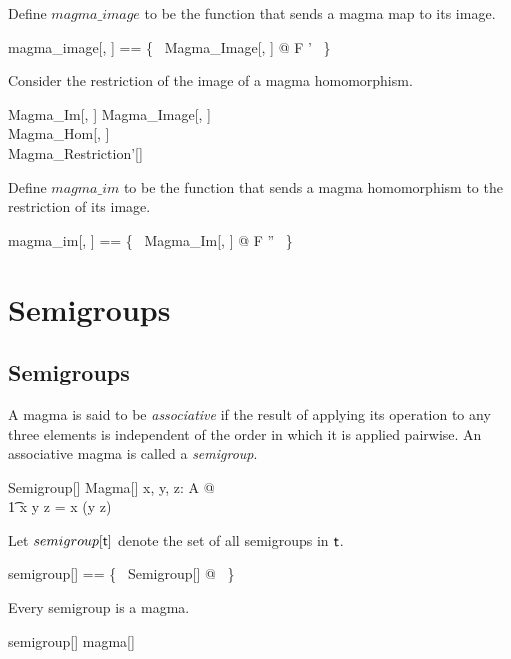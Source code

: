 \documentclass{amsart}
\begin{document}
Define $magma\_image$ to be the function that sends a magma map to its image.

\begin{zed}
	magma\_image[\genT, \genU] == \{~ Magma\_Image[\genT, \genU] @ F \mapsto \strucS' ~\}
\end{zed}

Consider the restriction of the image of a magma homomorphism.

\begin{schema}{Magma\_Im}[\genT, \genU]
	Magma\_Image[\genT, \genU] \\
	Magma\_Hom[\genT, \genU] \\
	Magma\_Restriction'[\genU]
\end{schema}

Define $magma\_im$ to be the function that sends a magma homomorphism to the
restriction of its image.

\begin{zed}
	magma\_im[\genT, \genU] == \{~ Magma\_Im[\genT, \genU] @ F \mapsto \strucA'' ~\}
\end{zed}

\section{Semigroups}

\subsection{Semigroups}

A magma is said to be \textit{associative} if the result of applying its operation to any three elements
is independent of the order in which it is applied pairwise.
An associative magma is called a \textit{semigroup}.

\begin{schema}{Semigroup}[\genT]
	Magma[\genT]
\where
	\forall x, y, z: A @ \\
	\t1	x \opG y \opG z = x \opG (y \opG z)
\end{schema}

Let $semigroup[\mathsf{t}]$ denote the set of all semigroups in $\mathsf{t}$.

\begin{zed}
	semigroup[\genT] == \{~ Semigroup[\genT] @ \strucA  ~\}
\end{zed}

\begin{remark} Every semigroup is a magma.

\begin{zed}
	semigroup[\setT] \subseteq magma[\setT]
\end{zed}

\end{remark}
\end{document}
